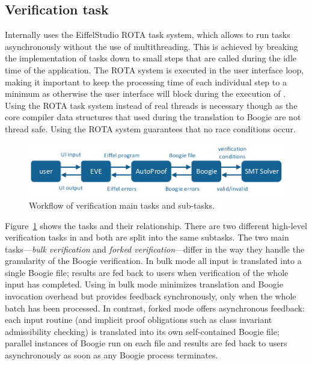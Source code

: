 \subsection{Verification task}

Internally \AutoProof uses the EiffelStudio ROTA task system, which allows to run tasks asynchronously without the use of multithreading. This is achieved by breaking the implementation of tasks down to small steps that are called during the idle time of the application. The ROTA system is executed in the user interface loop, making it important to keep the processing time of each individual step to a minimum as otherwise the user interface will block during the execution of \AutoProof. Using the ROTA task system instead of real threads is necessary though as the core compiler data structures that \AutoProof used during the translation to Boogie are not thread safe. Using the ROTA system guarantees that no race conditions occur.

\begin{figure}[!htb]
\begin{center}
\includegraphics[width=\columnwidth,page=2]{images/drawings.pdf}
\end{center}
\caption{Workflow of verification main tasks and sub-tasks.}
\label{fig:ap-tasks}
\end{figure}

Figure~\ref{fig:ap-tasks} shows the \AutoProof tasks and their relationship.
There are two different high-level verification tasks in \AutoProof and both are split into the same subtasks. 
The two main tasks---\emph{bulk verification} and \emph{forked verification}---differ in the way they handle the granularity of the Boogie verification. 
In bulk mode all input is translated into a single Boogie file; results are fed back to users when verification of the whole input has completed.
Using \AutoProof in bulk mode minimizes translation and Boogie invocation overhead but provides feedback synchronously, only when the whole batch has been processed.
In contrast, forked mode offers asynchronous feedback: each input routine (and implicit proof obligations such as class invariant admissibility checking) is translated into its own self-contained Boogie file; parallel instances of Boogie run on each file and results are fed back to users asynchronously as soon as any Boogie process terminates.

